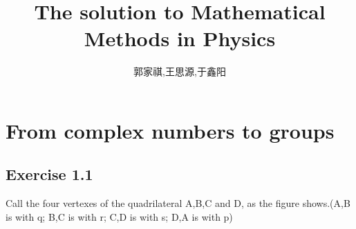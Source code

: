 \documentclass[]{ctexart}
\title{The solution to Mathematical Methods in Physics}
\author{郭家祺,王思源,于鑫阳}
\begin{document}
	\maketitle
		
\section{From complex numbers to groups}
	\subsection{Exercise 1.1}
	
	Call the four vertexes of the quadrilateral A,B,C and D, as the figure shows.(A,B is with q; B,C is with r; C,D is with s; D,A is with p)
	
\end{document}
